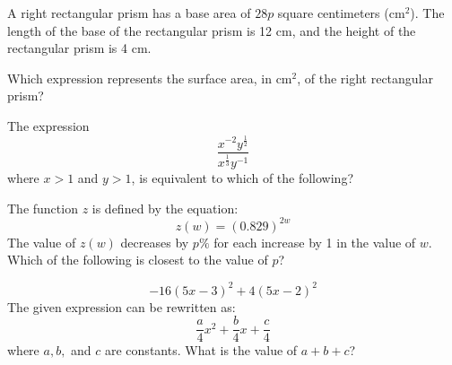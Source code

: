 \vspace{2em}
\newpage

\noindent\markforreview
\vspace{1em}

A right rectangular prism has a base area of \(28p\) square centimeters (\(\text{cm}^2\)). The length of the base of the rectangular prism is 12 cm, and the height of the rectangular prism is 4 cm.

Which expression represents the surface area, in \(\text{cm}^2\), of the right rectangular prism?

\vspace{0.75em}


\vspace{2em}
\newpage

\noindent\markforreview
\vspace{1em}

The expression
\[
\frac{x^{-2}y^{\frac{1}{2}}}{x^{\frac{1}{3}} y^{-1}}
\]
where \(x > 1\) and \(y > 1\), is equivalent to which of the following?

\vspace{0.75em}


\vspace{2em}
\newpage

\noindent\markforreview
\vspace{1em}

The function \(z\) is defined by the equation:
\[
z(w) = (0.829)^{2w}
\]
The value of \(z(w)\) decreases by \(p\%\) for each increase by 1 in the value of \(w\). Which of the following is closest to the value of \(p\)?

\vspace{0.75em}


\vspace{2em}
\newpage

\noindent\markforreview
\vspace{1em}

\[
-16(5x - 3)^2 + 4(5x - 2)^2
\]
The given expression can be rewritten as:
\[
\frac{a}{4}x^2 + \frac{b}{4}x + \frac{c}{4}
\]
where \(a, b,\) and \(c\) are constants. What is the value of \(a + b + c\)?

